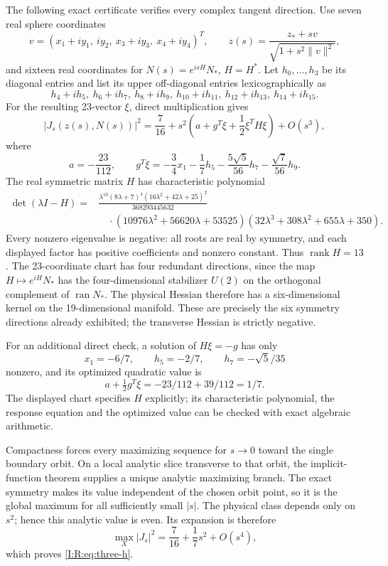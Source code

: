 The following exact certificate verifies every complex tangent direction.
Use seven real sphere coordinates
\[
 v=(x_1+iy_1,\ iy_2,\ x_3+iy_3,\ x_4+iy_4)^T,
 \qquad z(s)=\frac{z_*+sv}{\sqrt{1+s^2\|v\|^2}},
\]
and sixteen real coordinates for $N(s)=e^{isH}N_*$, $H=H^*$.
Let $h_0,\ldots,h_3$ be its diagonal entries and list its upper off-diagonal
entries lexicographically as
\[
 h_4+ih_5,\ h_6+ih_7,\ h_8+ih_9,\
 h_{10}+ih_{11},\ h_{12}+ih_{13},\ h_{14}+ih_{15}.
\]
For the resulting 23-vector $\xi$, direct multiplication gives
\[
 |J_s(z(s),N(s))|^2=\frac7{16}+
 s^2\left(a+g^T\xi+\frac12\xi^TH\xi\right)+O(s^3),
\]
where
\[
 a=-\frac{23}{112},\qquad
 g^T\xi=-\frac34x_1-\frac17h_5-
             \frac{5\sqrt5}{56}h_7-\frac{\sqrt7}{56}h_9.
\]
The real symmetric matrix $H$ has characteristic polynomial
\begin{align*}
 \det(\lambda I-H)
 ={}&\frac{\lambda^{10}(8\lambda+7)^4
                 (16\lambda^2+42\lambda+25)^2}{368293445632}\\
 &\quad\cdot(10976\lambda^2+56620\lambda+53525)
       (32\lambda^3+308\lambda^2+655\lambda+350).
\end{align*}
Every nonzero eigenvalue is negative: all roots are real by symmetry,
and each displayed factor has positive coefficients and nonzero constant.
Thus $\operatorname{rank}H=13$.
The 23-coordinate chart has four redundant directions, since the map
$H\mapsto e^{iH}N_*$ has the four-dimensional stabilizer $U(2)$ on the
orthogonal complement of $\operatorname{ran}N_*$.
The physical Hessian therefore has a six-dimensional kernel on the
19-dimensional manifold.  These are precisely the six symmetry directions
already exhibited; the transverse Hessian is strictly negative.

For an additional direct check, a solution of $H\xi=-g$ has only
\[
 x_1=-6/7,\qquad h_5=-2/7,\qquad h_7=-\sqrt5/35
\]
nonzero, and its optimized quadratic value is
\[
 a+\tfrac12g^T\xi=-23/112+39/112=1/7.
\]
The displayed chart specifies $H$ explicitly; its characteristic polynomial,
the response equation and the optimized value can be checked with exact
algebraic arithmetic.

Compactness forces every maximizing sequence for $s\to0$ toward the
single boundary orbit. On a local analytic slice transverse to that orbit,
the implicit-function theorem supplies a unique analytic maximizing branch.
The exact symmetry makes its value independent of the chosen orbit point,
so it is the global maximum for all sufficiently small $|s|$.
The physical class depends only on $s^2$; hence this analytic value is even.
Its expansion is therefore
\[
 \max_X|J_s|^2=\frac7{16}+\frac17s^2+O(s^4),
\]
which proves \eqref{I:R:eq:three-h}.

